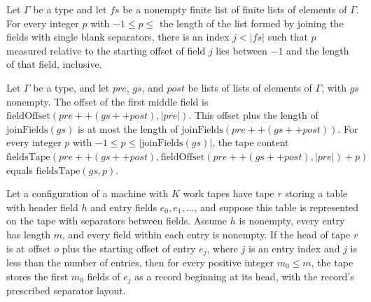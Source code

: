 \begin{theorem}
\label{Turing.rt_field_cover}
\leanok
{}
Let $\Gamma$ be a type and let $fs$ be a nonempty finite list of finite lists of
elements of $\Gamma$. For every integer $p$ with $-1\le p\le$ the length of the list
formed by joining the fields with single blank separators, there is an index $j<|fs|$
such that $p$ measured relative to the starting offset of field $j$ lies between $-1$
and the length of that field, inclusive.
\end{theorem}

\begin{theorem}
\label{Turing.rt_fields_slice}
\leanok
{}
Let $\Gamma$ be a type, and let $pre$, $gs$, and $post$ be lists of lists of elements
of $\Gamma$, with $gs$ nonempty. The offset of the first middle field is
$\mathrm{fieldOffset}(pre++(gs++post),|pre|)$. This offset plus the length of
$\mathrm{joinFields}(gs)$ is at most the length of $\mathrm{joinFields}(pre++(gs++post))$.
For every integer $p$ with $-1\le p\le |\mathrm{joinFields}(gs)|$, the tape content
$\mathrm{fieldsTape}(pre++(gs++post),\mathrm{fieldOffset}(pre++(gs++post),|pre|)+p)$
equals $\mathrm{fieldsTape}(gs,p)$.
\end{theorem}

\begin{theorem}
\label{Turing.TableAt.recordAt_take}
\leanok
{}
Let a configuration of a machine with $K$ work tapes have tape $r$ storing a table with
header field $h$ and entry fields $e_0,e_1,\ldots$, and suppose this table is
represented on the tape with separators between fields. Assume $h$ is nonempty, every
entry has length $m$, and every field within each entry is nonempty. If the head of tape
$r$ is at offset $o$ plus the starting offset of entry $e_j$, where $j$ is an entry
index and $j$ is less than the number of entries, then for every positive integer
$m_0\le m$, the tape stores the first $m_0$ fields of $e_j$ as a record beginning at its
head, with the record's prescribed separator layout.
\end{theorem}

